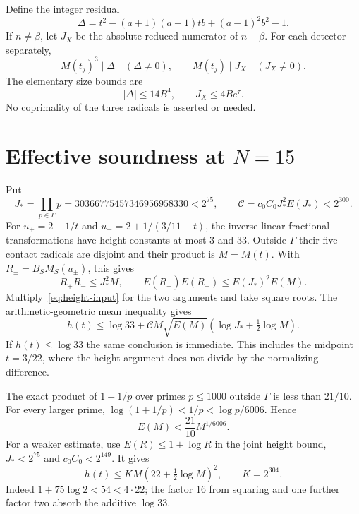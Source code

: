 \documentclass[11pt,a4paper]{article}
\begin{document}
Define the integer residual
\[
 \Delta=t^2-(a+1)(a-1)tb+(a-1)^2b^2-1.
\]
If $n\ne\beta$, let $J_X$ be the absolute reduced numerator
of $n-\beta$. For each detector separately,
\begin{equation}\label{eq:residual-div}
 M(t_j)^3\mid\Delta\quad(\Delta\ne0),\qquad
 M(t_j)\mid J_X\quad(J_X\ne0).
\end{equation}
The elementary size bounds are
\[
                 |\Delta|\le14B^4,\qquad J_X\le4Be^\tau.
\]
No coprimality of the three radicals is asserted or needed.

\section{Effective soundness at \texorpdfstring{$N=15$}{N=15}}

Put
\[
 J_*=\prod_{p\in\Gamma}p
       =30366775457346956958330<2^{75},\qquad
 \mathcal C=c_0C_0J_*^2E(J_*)<2^{300}.
\]
For $u_+=2+1/t$ and $u_-=2+1/(3/11-t)$, the inverse
linear-fractional transformations have height constants at most
3 and 33. Outside $\Gamma$ their five-contact radicals are
disjoint and their product is $M=M(t)$. With
$R_\pm=B_SM_S(u_\pm)$, this gives
\[
 R_+R_-\le J_*^2M,\qquad
 E(R_+)E(R_-)\le E(J_*)^2E(M).
\]
Multiply~\eqref{eq:height-input} for the two arguments and take
square roots. The arithmetic-geometric mean inequality gives
\begin{equation}\label{eq:reflected-sharp}
 h(t)\le\log33+\mathcal C M\sqrt{E(M)}
                         (\log J_*+\tfrac12\log M).
\end{equation}
If $h(t)\le\log33$ the same conclusion is immediate.
This includes the midpoint $t=3/22$, where the height argument
does not divide by the normalizing difference.

The exact product of $1+1/p$ over primes $p\le1000$ outside
$\Gamma$ is less than $21/10$. For every larger prime,
$\log(1+1/p)<1/p<\log p/6006$. Hence
\begin{equation}\label{eq:euler}
                  E(M)<\frac{21}{10}M^{1/6006}.
\end{equation}
For a weaker estimate, use $E(R)\le1+\log R$ in the joint
height bound, $J_*<2^{75}$ and $c_0C_0<2^{149}$. It gives
\begin{equation}\label{eq:reflected-coarse}
       h(t)\le K M(22+\tfrac12\log M)^2,\qquad K=2^{304}.
\end{equation}
Indeed $1+75\log2<54<4\cdot22$; the factor 16 from squaring
and one further factor two absorb the additive $\log33$.
\end{document}
